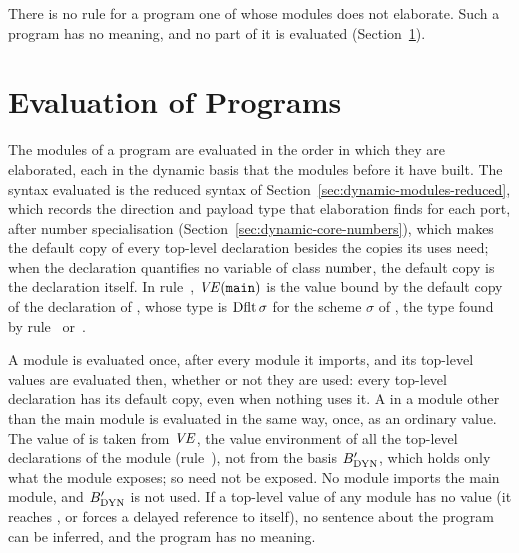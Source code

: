 There is no rule for a program one of whose modules does not elaborate. Such
a program has no meaning, and no part of it is evaluated
(Section~\ref{sec:programs-evaluation}).

\section{Evaluation of Programs}\label{sec:programs-evaluation}

The modules of a program are evaluated in the order in which they are
elaborated, each in the dynamic basis that the modules before it have built.
The syntax evaluated is the reduced syntax of
Section~\ref{sec:dynamic-modules-reduced}, which records the direction and
payload type that elaboration finds for each port, after number
specialisation (Section~\ref{sec:dynamic-core-numbers}), which makes the
default copy of every top-level declaration besides the copies its uses
need; when the declaration quantifies no variable of class $\mathrm{number}$, the
default copy is the declaration itself. In rule~,
$\mathit{VE}(\textnormal{\texttt{main}})$ is the value bound by the default copy of the declaration of
, whose type is $\mathrm{Dflt}\,\sigma$ for the scheme $\sigma$ of ,
the type found by rule~
or~. %


  {}

  {}

\begin{rulecomments}
 A module is evaluated once, after every module it
imports, and its top-level values are evaluated then, whether or not they are
used: every top-level declaration has its default copy, even when nothing
uses it. A  in a module other than the main module is evaluated in the
same way, once, as an ordinary value. %
 The value of  is taken from $\mathit{VE}$, the value
environment of all the top-level declarations of the module
(rule~), not from the basis $B_{\mathrm{DYN}}'$, which holds only
what the module exposes; so  need not be exposed. No module imports
the main module, and $B_{\mathrm{DYN}}'$ is not used. %
If a top-level value of any module has no value (it reaches
, or forces a delayed reference to itself), no sentence about
the program can be inferred, and the program has no meaning. %
\end{rulecomments}

